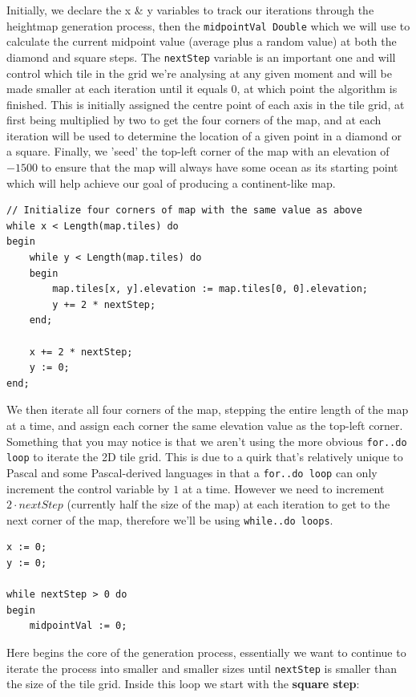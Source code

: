 \documentclass{article}
\begin{document}
Initially, we declare the x \& y variables to track our iterations through the heightmap generation process, then the \texttt{midpointVal Double} which we will use to calculate the current midpoint value (average plus a random value) at both the diamond and square steps. The \texttt{nextStep} variable is an important one and will control which tile in the grid we're analysing at any given moment and will be made smaller at each iteration until it equals 0, at which point the algorithm is finished. This is initially assigned the centre point of each axis in the tile grid, at first being multiplied by two to get the four corners of the map, and at each iteration will be used to determine the location of a given point in a diamond or a square. Finally, we 'seed' the top-left corner of the map with an elevation of $-1500$ to ensure that the map will always have some ocean as its starting point which will help achieve our goal of producing a continent-like map.

\begin{verbatim}
// Initialize four corners of map with the same value as above
while x < Length(map.tiles) do
begin
	while y < Length(map.tiles) do
	begin
		map.tiles[x, y].elevation := map.tiles[0, 0].elevation;
		y += 2 * nextStep;
	end;

	x += 2 * nextStep;
	y := 0;
end;
\end{verbatim}

We then iterate all four corners of the map, stepping the entire length of the map at a time, and assign each corner the same elevation value as the top-left corner. Something that you may notice is that we aren't using the more obvious \texttt{for..do loop} to iterate the 2D tile grid. This is due to a quirk that's relatively unique to Pascal and some Pascal-derived languages in that a \texttt{for..do loop} can only increment the control variable by $1$ at a time. However we need to increment $2 \cdot nextStep$ (currently half the size of the map) at each iteration to get to the next corner of the map, therefore we'll be using \texttt{while..do loops}.

\begin{verbatim}
x := 0;
y := 0;

while nextStep > 0 do
begin
	midpointVal := 0;
\end{verbatim}

Here begins the core of the generation process, essentially we want to continue to iterate the process into smaller and smaller sizes until \texttt{nextStep} is smaller than the size of the tile grid. Inside this loop we start with the \textbf{square step}:
\end{document}
